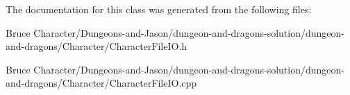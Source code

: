 The documentation for this class was generated from the following files\+:\begin{DoxyCompactItemize}
\item 
Bruce Character/\+Dungeons-\/and-\/\+Jason/dungeon-\/and-\/dragons-\/solution/dungeon-\/and-\/dragons/\+Character/Character\+File\+I\+O.\+h\item 
Bruce Character/\+Dungeons-\/and-\/\+Jason/dungeon-\/and-\/dragons-\/solution/dungeon-\/and-\/dragons/\+Character/Character\+File\+I\+O.\+cpp\end{DoxyCompactItemize}
